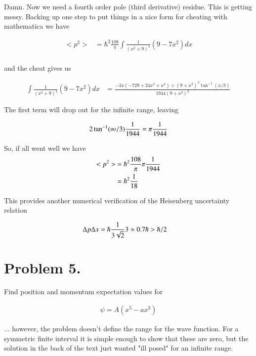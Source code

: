 \documentclass{article}
\begin{document}
Damn.  Now we need a fourth order pole (third derivative) residue.  This is getting messy.  Backing up one step to put
things in a nice form for cheating with mathematica we have

\begin{align*}
<p^2> &= \hbar^2 \frac{108}{\pi} \int \frac{1}{(x^2 + 9)^4} \left(9 - 7x^2 \right) dx \\
\end{align*}

and the cheat gives us

\begin{align*}
\int \frac{1}{(x^2 + 9)^4} \left(9 - 7x^2 \right) dx 
&= \frac{-3 x (-729 + 24 x^2 + x^4) + (9 + x^2)^3 \tan^{-1}(x/3)}{1944 (9 + x^2)^3}
\end{align*}

The first term will drop out for the infinite range, leaving 

\begin{align*}
2\tan^{-1}(\infty/3)\frac{1}{1944} = \pi \frac{1}{1944}
\end{align*}

So, if all went well we have
\begin{align*}
<p^2> 
&= \hbar^2 \frac{108}{\pi} \pi \frac{1}{1944} \\
&= \hbar^2 \frac{1}{18}
\end{align*}

This provides another numerical verification of the Heisenberg uncertainty relation

\begin{align*}
\Delta p \Delta x &= \hbar \frac{1}{3 \sqrt{2}} 3 \approx 0.7 \hbar > \hbar/2
\end{align*}

\section{ Problem 5. }

Find position and momentum expectation values for 

\begin{align*}
\psi = A(x^5 - a x^3)
\end{align*}

... however, the problem doesn't define the range for the wave function.
For a symmetric finite interval it is simple enough to show that these 
are zero, but the solution in the back of the text just wanted "ill posed"
for an infinite range.
\end{document}
